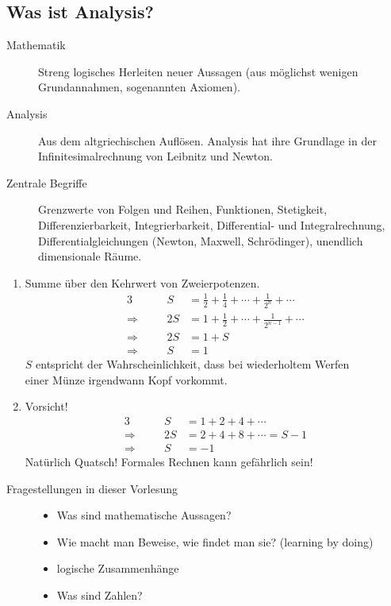 \documentclass[../ana1.tex]{subfiles}
\begin{document}
\begin{prosa}
\section{Was ist Analysis?}
\begin{description}
	\item[Mathematik]
		Streng logisches Herleiten neuer Aussagen (aus möglichst wenigen Grundannahmen, sogenannten Axiomen).
	\item[Analysis]
		Aus dem altgriechischen \glqq Auflösen\grqq. Analysis hat ihre Grundlage in der \glqq Infinitesimalrechnung\grqq\: von Leibnitz und Newton.
	\item[Zentrale Begriffe]
		Grenzwerte von Folgen und Reihen, Funktionen, Stetigkeit, Differenzierbarkeit, Integrierbarkeit, Differential- und Integralrechnung, Differentialgleichungen (Newton, Maxwell, Schrödinger), unendlich dimensionale Räume.
\end{description}
\begin{bspe}\leavevmode
	\begin{enumerate}[(1)]
		\item Summe über den Kehrwert von Zweierpotenzen.
			\begin{alignat*}{3}
							   &&             S &= \frac{1}{2} + \frac{1}{4} + \cdots + \frac{1}{2^{n}} + \cdots \\
				\Longrightarrow&\quad& 		 2S &= 1 + \frac{1}{2} + \cdots + \frac{1}{2^{n-1}} + \cdots \\
				\Longrightarrow&\quad& 	     2S &= 1 + S \\
				\Longrightarrow&&             S &= 1
			\end{alignat*}
			\(S\) entspricht der Wahrscheinlichkeit, dass bei wiederholtem Werfen \\
			einer Münze irgendwann Kopf vorkommt.\\
		\item Vorsicht!
			\begin{alignat*}{3}
							   &&       S &= 1 + 2 + 4 + \cdots\\
				\Longrightarrow&\quad& 2S &= 2 + 4 + 8 + \cdots = S - 1\\
				\Longrightarrow&\quad&  S &= -1
			\end{alignat*}
			Natürlich Quatsch! Formales Rechnen kann gefährlich sein!
	\end{enumerate}
\end{bspe}
\begin{description}
	\item[Fragestellungen in dieser Vorlesung]\leavevmode
		\begin{itemize}[-]
			\item Was sind mathematische Aussagen?
			\item Wie macht man Beweise, wie findet man sie? (learning by doing)
			\item logische Zusammenhänge
			\item Was sind Zahlen?
		\end{itemize} 
\end{description}
\end{prosa}
\end{document}
